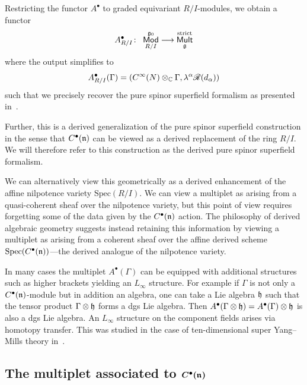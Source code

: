 \documentclass[pdftex]{sigma}
\numberwithin{equation}{section}
\def\cat#1{\ensuremath{\mathsf{#1}}}
\DeclareMathOperator{\Mod}{\cat{Mod}}
\DeclareMathOperator{\Mult}{\cat{Mult}}
\def\sR{\mathscr R}
\begin{document}
Restricting the functor $A^\bullet$ to graded equivariant $R/I$-modules, we obtain a functor
\begin{equation*}
A^\bullet_{R/I} \colon \ \Mod_{R/I}^{\fg_0} \longrightarrow \Mult_{\fg}^{\mathrm{strict}}
\end{equation*}
where the output simplifies to
\begin{equation*}
A^\bullet_{R/I} (\Gamma) = \left( C^\infty(N) \otimes_\CC \Gamma , \lambda^\alpha \sR(d_\alpha) \right)
\end{equation*}
such that we precisely recover the pure spinor superfield formalism as presented in~\cite{perspectives}.

Further, this is a derived generalization of the pure spinor superfield construction in the sense that $C^\bullet(\mathfrak n)$ can be viewed as a derived replacement of the ring $R/I$. We will therefore refer to this construction as the derived pure spinor superfield formalism.

\begin{rmk}
	We can alternatively view this geometrically as a derived enhancement of the affine nilpotence variety $\mathrm{Spec}(R/I)$. We can view a multiplet as arising from a quasi-coherent sheaf over the nilpotence variety, but this point of view requires forgetting some of the data given by the $C^\bullet(\mathfrak n)$ action. The philosophy of derived algebraic geometry suggests instead retaining this information by viewing a multiplet as arising from a coherent sheaf over the affine derived scheme $\mathrm{Spec}(C^\bullet(\mathfrak n))$---the derived analogue of the nilpotence variety.
\end{rmk}

\begin{rmk}
	In many cases the multiplet $A^\bullet(\Gamma)$ can be equipped with additional structures such as higher brackets yielding an $L_\infty$ structure. For example if $\Gamma$ is not only a $C^\bullet(\mathfrak n)$-module but in addition an algebra, one can take a Lie algebra $\mathfrak h$ such that the tensor product $\Gamma \otimes \mathfrak h$ forms a dgs Lie algebra. Then $A^\bullet(\Gamma \otimes \mathfrak h) = A^\bullet(\Gamma) \otimes \mathfrak h$ is also a dgs Lie algebra. An $L_\infty$ structure on the component fields arises via homotopy transfer. This was studied in the case of ten-dimensional super Yang--Mills theory in~\cite{AKLL, perspectives}.
\end{rmk}

\subsection[The multiplet associated to C\^{}bullet(n)]{The multiplet associated to $\boldsymbol{C^\bullet(\mathfrak n)}$} \label{sec: forms}
\end{document}
